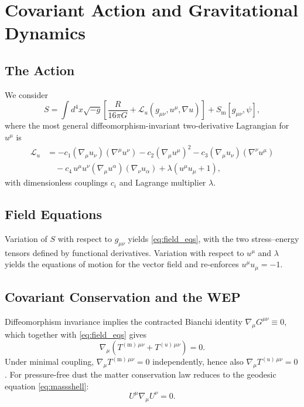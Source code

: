 \documentclass[12pt,a4paper]{article}
\newcommand{\Sm}{S_{\mathrm{m}}}
\begin{document}
\section{Covariant Action and Gravitational Dynamics}
\label{sec:action}

\subsection{The Action}

We consider~\citep{jacobson2001,jacobson2008}
\begin{equation}
  S=\int d^{4}x\sqrt{-g}\!\left[\frac{R}{16\pi G}
    +\mathcal{L}_{u}(g_{\mu\nu},u^{\mu},\nabla u)\right]+\Sm[g_{\mu\nu},\psi],
  \label{eq:S}
\end{equation}
where the most general diffeomorphism-invariant two-derivative Lagrangian for
$u^{\mu}$ is~\citep{jacobson2001}
\begin{align}
  \mathcal{L}_{u} &= -c_{1}(\nabla_{\!\mu}u_{\nu})(\nabla^{\mu}u^{\nu})
                    -c_{2}(\nabla_{\!\mu}u^{\mu})^{2}
                    -c_{3}(\nabla_{\!\mu}u_{\nu})(\nabla^{\nu}u^{\mu})\nonumber\\
                  &\quad -c_{4}\,u^{\mu}u^{\nu}(\nabla_{\!\mu}u^{\alpha})
                             (\nabla_{\!\nu}u_{\alpha})
                    +\lambda(u^{\mu}u_{\mu}+1),
  \label{eq:Lu}
\end{align}
with dimensionless couplings $c_{i}$ and Lagrange multiplier $\lambda$.

\subsection{Field Equations}

Variation of $S$ with respect to $g_{\mu\nu}$ yields \cref{eq:field_eqs},
with the two stress--energy tensors defined by functional derivatives.
Variation with respect to $u^{\mu}$ and $\lambda$ yields the equations of
motion for the vector field and re-enforces $u^{\mu}u_{\mu}=-1$.

\subsection{Covariant Conservation and the WEP}

Diffeomorphism invariance implies the contracted Bianchi identity
$\nabla_{\!\mu}G^{\mu\nu}\equiv 0$, which together with \cref{eq:field_eqs}
gives
\begin{equation}
  \nabla_{\!\mu}\!\left(T^{(\mathrm{m})\,\mu\nu}+T^{(u)\,\mu\nu}\right)=0.
\end{equation}
Under minimal coupling, $\nabla_{\!\mu}T^{(\mathrm{m})\,\mu\nu}=0$
independently, hence also $\nabla_{\!\mu}T^{(u)\,\mu\nu}=0$. For
pressure-free dust the matter conservation law reduces to the geodesic
equation \eqref{eq:massshell}:
\begin{equation}
  U^{\mu}\nabla_{\!\mu}U^{\nu}=0.
  \label{eq:geodesic}
\end{equation}
\end{document}
